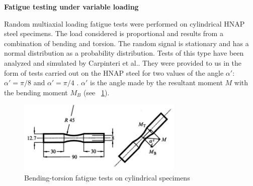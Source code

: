 \documentclass[3p,times,number,review]{elsarticle}
\newcommand{\figref}[1]{\figurename~\ref{#1}}
\begin{document}
\noindent
\textbf{Fatigue testing under variable loading}

Random multiaxial loading fatigue tests were performed on cylindrical HNAP steel specimens\cite{ACHTELIC1994}. The load considered is proportional and results from a combination of bending and torsion. The random signal is stationary and has a normal distribution as a probability distribution. Tests of this type have been analyzed and simulated by Carpinteri et al.\cite{carpinteri2003multiaxial}. They were provided to us in the form of tests carried out on the HNAP steel for two values of the angle $\alpha'$: $\alpha' = \pi / 8$ and $\alpha' = \pi / 4$ . $\alpha' $ is the angle made by the resultant moment $M$ with the bending moment $M_B$ (see \figref{fig.10HNAPsample}).

\begin{figure}[!h]
	\centering
	\includegraphics[width=0.7\textwidth]{figures//10HNAPsample.png} 
	\caption{Bending-torsion fatigue tests on cylindrical specimens\cite{carpinteri2003multiaxial}}
	\label{fig.10HNAPsample}
\end{figure}
\end{document}

